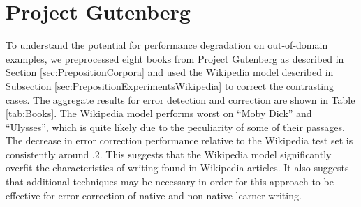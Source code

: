 

\section{Project Gutenberg}

To understand the potential for performance degradation on out-of-domain examples, we preprocessed eight books from Project Gutenberg as described in Section \ref{sec:PrepositionCorpora} and used the Wikipedia model described in Subsection \ref{sec:PrepositionExperimentsWikipedia} to correct the contrasting cases.  The aggregate results for error detection and correction are shown in Table \ref{tab:Books}.  The Wikipedia model performs worst on ``Moby Dick'' and ``Ulysses'', which is quite likely due to the peculiarity of some of their passages.  The decrease in error correction performance relative to the Wikipedia test set is consistently around .2.  This suggests that the Wikipedia model significantly overfit the characteristics of writing found in Wikipedia articles.  It also suggests that additional techniques may be necessary in order for this approach to be effective for error correction of native and non-native learner writing.




